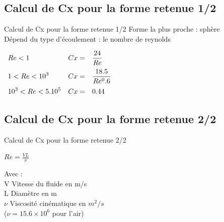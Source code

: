 \documentclass{beamer}
\begin{document}
\subsection{Calcul de Cx pour la forme retenue 1/2}
\begin{frame}{Calcul de Cx pour la forme retenue 1/2}
 Forme la plus proche : sphère \\
 Dépend du type d'écoulement : le nombre de reynolds \\
 \begin{center}
  $\begin{array}{>{\displaystyle}l>{\displaystyle}l>{\displaystyle}l}
   Re < 1 & Cx = & \frac{24}{Re} \medbreak \\
   1 < Re < 10^3 & Cx = & \frac{18.5}{Re^0.6} \medbreak \\
   10^3 < Re < 5.10^5 & Cx = & 0.44
  \end{array}$
 \end{center}
\end{frame}

\subsection{Calcul de Cx pour la forme retenue 2/2}
\begin{frame}{Calcul de Cx pour la forme retenue 2/2}
 \begin{center}
  $\displaystyle{Re = \frac{VL}{\nu}}$
 \end{center}
 Avec : \\
 V Vitesse du fluide en m/s \\
 L Diamètre en m \\
 $\nu$ Viscosité cinématique en $m^2/s$ \\
 ($\nu = 15.6 \times 10^6$ pour l'air)
\end{frame}
\end{document}
